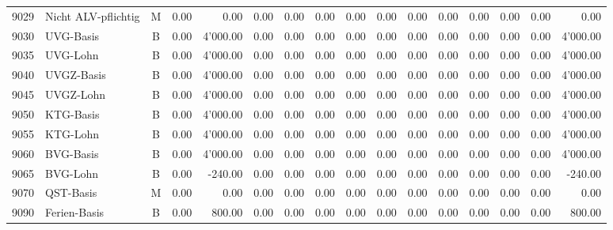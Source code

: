 \documentclass[8pt,a4paper]{extarticle}
\begin{document}
\begin{longtable}{@{\extracolsep{\fill}} l l c r r r r r r r r r r r r r}
9029&Nicht ALV-pflichtig&M&0.00&0.00&0.00&0.00&0.00&0.00&0.00&0.00&0.00&0.00&0.00&0.00&0.00\\
9030&UVG-Basis&B&0.00&4'000.00&0.00&0.00&0.00&0.00&0.00&0.00&0.00&0.00&0.00&0.00&4'000.00\\
9035&UVG-Lohn&B&0.00&4'000.00&0.00&0.00&0.00&0.00&0.00&0.00&0.00&0.00&0.00&0.00&4'000.00\\
9040&UVGZ-Basis&B&0.00&4'000.00&0.00&0.00&0.00&0.00&0.00&0.00&0.00&0.00&0.00&0.00&4'000.00\\
9045&UVGZ-Lohn&B&0.00&4'000.00&0.00&0.00&0.00&0.00&0.00&0.00&0.00&0.00&0.00&0.00&4'000.00\\
9050&KTG-Basis&B&0.00&4'000.00&0.00&0.00&0.00&0.00&0.00&0.00&0.00&0.00&0.00&0.00&4'000.00\\
9055&KTG-Lohn&B&0.00&4'000.00&0.00&0.00&0.00&0.00&0.00&0.00&0.00&0.00&0.00&0.00&4'000.00\\
9060&BVG-Basis&B&0.00&4'000.00&0.00&0.00&0.00&0.00&0.00&0.00&0.00&0.00&0.00&0.00&4'000.00\\
9065&BVG-Lohn&B&0.00&-240.00&0.00&0.00&0.00&0.00&0.00&0.00&0.00&0.00&0.00&0.00&-240.00\\
9070&QST-Basis&M&0.00&0.00&0.00&0.00&0.00&0.00&0.00&0.00&0.00&0.00&0.00&0.00&0.00\\
9090&Ferien-Basis&B&0.00&800.00&0.00&0.00&0.00&0.00&0.00&0.00&0.00&0.00&0.00&0.00&800.00\\

\end{longtable}
\pagebreak
\end{document}
